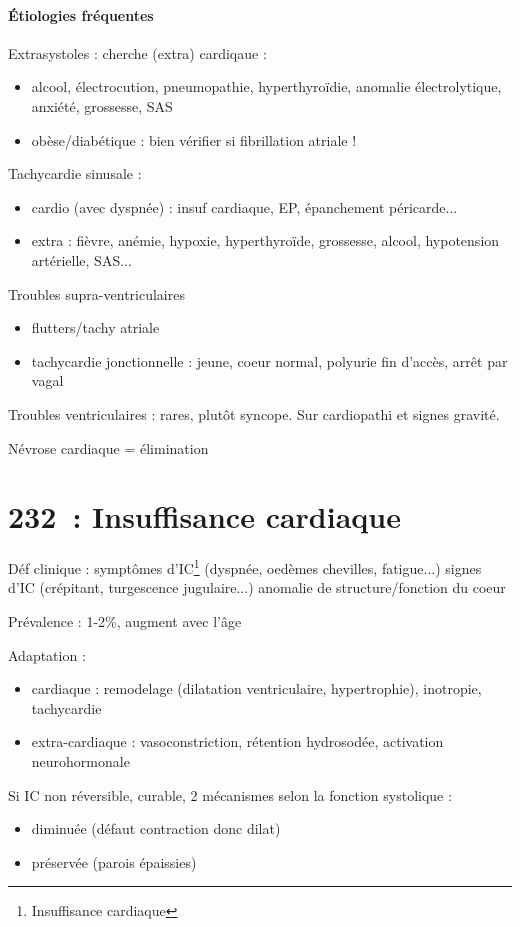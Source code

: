 \documentclass{article}
\begin{document}
\paragraph{Étiologies fréquentes}
Extrasystoles : cherche (extra) cardiqaue :
\begin{itemize}
  \item alcool, électrocution, pneumopathie, hyperthyroïdie, anomalie
    électrolytique, anxiété, grossesse, SAS
  \item \danger{} obèse/diabétique : bien vérifier si fibrillation atriale !
\end{itemize}
Tachycardie sinusale :
\begin{itemize}
  \item cardio (avec dyspnée) : insuf cardiaque, EP, épanchement péricarde...
  \item extra : fièvre, anémie, hypoxie, hyperthyroïde, grossesse, alcool,
    hypotension artérielle, SAS...
\end{itemize}
Troubles supra-ventriculaires
\begin{itemize}
  \item flutters/tachy atriale
  \item tachycardie jonctionnelle : jeune, coeur normal, polyurie fin d'accès,
    arrêt par vagal
\end{itemize}
Troubles ventriculaires : rares, plutôt syncope. Sur cardiopathi et signes
gravité.

Névrose cardiaque = élimination


\section{232 : Insuffisance cardiaque}%
\label{sec:insuffisance_cardiaque}
Déf clinique : symptômes d'IC\footnote{Insuffisance cardiaque} (dyspnée, oedèmes
chevilles, fatigue...) \land{} signes d'IC (crépitant, turgescence jugulaire...)
\land{} anomalie de structure/fonction du coeur

Prévalence : 1-2\%, augment avec l'âge

Adaptation :
\begin{itemize}
  \item cardiaque : remodelage (dilatation ventriculaire, hypertrophie), \inc
    inotropie, tachycardie
  \item extra-cardiaque : vasoconstriction, rétention hydrosodée, activation
    neurohormonale
\end{itemize}
Si IC non réversible, curable, 2 mécanismes selon la fonction systolique :
\begin{itemize}
  \item diminuée (défaut contraction donc dilat)
  \item préservée (parois épaissies)
\end{itemize}
\end{document}
